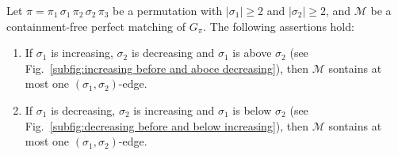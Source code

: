 \documentclass[a4paper]{llncs}
\begin{document}
\begin{lemma}
  \label{lemma:at most one edge monotone}
  Let $\pi = \pi_1 \, \sigma_1 \, \pi_2 \, \sigma_2 \, \pi_3$
  be a permutation with $|\sigma_1| \geq 2$ and $|\sigma_2| \geq 2$,
  and $\mathcal{M}$ be a containment-free perfect matching of $G_\pi$.
  The following assertions hold:
  \begin{enumerate}
    \item
    If $\sigma_1$ is increasing, $\sigma_2$ is decreasing and
    $\sigma_1$ is above $\sigma_2$
    (see Fig.~\ref{subfig:increasing before and aboce decreasing}),
    then $\mathcal{M}$ sontains at most one $(\sigma_1, \sigma_2)$-edge.
    \item
    If $\sigma_1$ is decreasing, $\sigma_2$ is increasing and
    $\sigma_1$ is below $\sigma_2$
    (see Fig.~\ref{subfig:decreasing before and below increasing}),
    then $\mathcal{M}$ sontains at most one $(\sigma_1, \sigma_2)$-edge.
  \end{enumerate}
\end{lemma}
\end{document}
